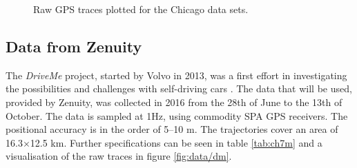 \begin{figure}[H]%
 \centering
 
 \caption{Raw GPS traces plotted for the Chicago data sets.}%
 \label{fig:data/chdata}
\end{figure}


\subsection{Data from Zenuity}

The \textit{DriveMe} project, started by Volvo in 2013, was a first effort in investigating the possibilities and challenges with self-driving cars \citep{volvo}. The data that will be used, provided by Zenuity, was collected in 2016 from the 28th of June to the 13th of October. The data is sampled at 1Hz, using commodity SPA GPS receivers. The positional accuracy is in the order of 5--10 m. The trajectories cover an area of 16.3$\times$12.5 km. Further specifications can be seen in table \ref{tab:ch7m} and a visualisation of the raw traces in figure \ref{fig:data/dm}.


